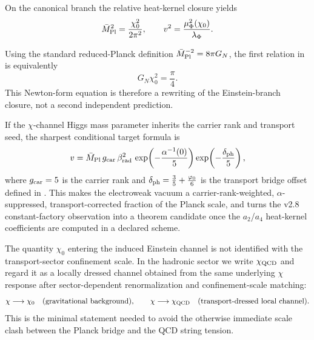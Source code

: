 \begin{conjecture}
On the canonical branch the relative heat-kernel closure yields
\begin{equation}
\label{eq:induced-einstein}
\bar M_{\mathrm{Pl}}^2=\frac{\chi_0^2}{2\pi^2},
\qquad
v^2=\frac{\mu_\Phi^2(\chi_0)}{\lambda_\Phi}.
\end{equation}
\end{conjecture}

\begin{remark}
Using the standard reduced-Planck definition $\bar M_{\mathrm{Pl}}^{-2}=8\pi G_N$, the first relation in  is equivalently
\[
G_N\chi_0^2=\frac{\pi}{4}.
\]
This Newton-form equation is therefore a rewriting of the Einstein-branch closure, not a second independent prediction.
\end{remark}

\begin{conjecture}
If the $\chi$-channel Higgs mass parameter inherits the carrier rank and transport seed, the sharpest conditional target formula is
\begin{equation}
\label{eq:carrier-dressed-v}
v
=
\bar M_{\mathrm{Pl}}\,g_{\mathrm{car}}\,\beta_{\mathrm{rad}}^2\,
\exp\!\left(-\frac{\alpha^{-1}(0)}{5}\right)
\exp\!\left(-\frac{\delta_{\mathrm{ph}}}{5}\right),
\end{equation}
where $g_{\mathrm{car}}=5$ is the carrier rank and $\delta_{\mathrm{ph}}=\frac35+\frac{\varphi_0}{6}$ is the transport bridge offset defined in . This makes the electroweak vacuum a carrier-rank-weighted, $\alpha$-suppressed, transport-corrected fraction of the Planck scale, and turns the v2.8 constant-factory observation into a theorem candidate once the $a_2$/$a_4$ heat-kernel coefficients are computed in a declared scheme.
\end{conjecture}

\begin{remark}
The quantity $\chi_0$ entering the induced Einstein channel is not identified with the transport-sector confinement scale. In the hadronic sector we write $\chi_{\mathrm{QCD}}$ and regard it as a locally dressed channel obtained from the same underlying $\chi$ response after sector-dependent renormalization and confinement-scale matching:
\[
\chi \longrightarrow \chi_0 \quad \text{(gravitational background)},
\qquad
\chi \longrightarrow \chi_{\mathrm{QCD}} \quad \text{(transport-dressed local channel)}.
\]
This is the minimal statement needed to avoid the otherwise immediate scale clash between the Planck bridge and the QCD string tension.
\end{remark}

